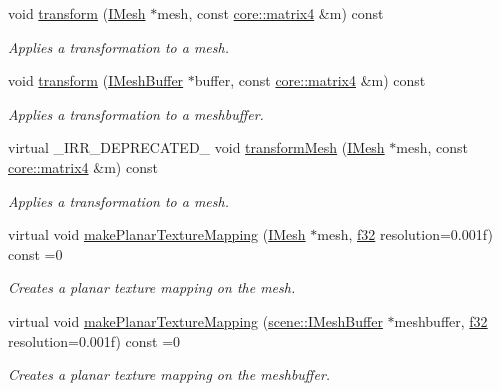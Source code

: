 \begin{DoxyCompactItemize}
void \hyperlink{classirr_1_1scene_1_1IMeshManipulator_a9f9962d31cbd4ebeb1be0812765884cf}{transform} (\hyperlink{classirr_1_1scene_1_1IMesh}{I\+Mesh} $\ast$mesh, const \hyperlink{namespaceirr_1_1core_a73fa92e638c5ca97efd72da307cc9b65}{core\+::matrix4} \&m) const
\begin{DoxyCompactList}\small\item\em Applies a transformation to a mesh. \end{DoxyCompactList}\item 
void \hyperlink{classirr_1_1scene_1_1IMeshManipulator_a14dc2101f7facaddec49f59ed363bbc1}{transform} (\hyperlink{classirr_1_1scene_1_1IMeshBuffer}{I\+Mesh\+Buffer} $\ast$buffer, const \hyperlink{namespaceirr_1_1core_a73fa92e638c5ca97efd72da307cc9b65}{core\+::matrix4} \&m) const
\begin{DoxyCompactList}\small\item\em Applies a transformation to a meshbuffer. \end{DoxyCompactList}\item 
virtual \+\_\+\+I\+R\+R\+\_\+\+D\+E\+P\+R\+E\+C\+A\+T\+E\+D\+\_\+ void \hyperlink{classirr_1_1scene_1_1IMeshManipulator_a10e09e28622a5d1f5fd0f3a65fd2cb5b}{transform\+Mesh} (\hyperlink{classirr_1_1scene_1_1IMesh}{I\+Mesh} $\ast$mesh, const \hyperlink{namespaceirr_1_1core_a73fa92e638c5ca97efd72da307cc9b65}{core\+::matrix4} \&m) const
\begin{DoxyCompactList}\small\item\em Applies a transformation to a mesh. \end{DoxyCompactList}\item 
virtual void \hyperlink{classirr_1_1scene_1_1IMeshManipulator_a82a3092d53e84e751bb13dac8dfa2ab4}{make\+Planar\+Texture\+Mapping} (\hyperlink{classirr_1_1scene_1_1IMesh}{I\+Mesh} $\ast$mesh, \hyperlink{namespaceirr_a0277be98d67dc26ff93b1a6a1d086b07}{f32} resolution=0.\+001f) const =0
\begin{DoxyCompactList}\small\item\em Creates a planar texture mapping on the mesh. \end{DoxyCompactList}\item 
virtual void \hyperlink{classirr_1_1scene_1_1IMeshManipulator_a757511833420a24ed8cbf4dfd6607143}{make\+Planar\+Texture\+Mapping} (\hyperlink{classirr_1_1scene_1_1IMeshBuffer}{scene\+::\+I\+Mesh\+Buffer} $\ast$meshbuffer, \hyperlink{namespaceirr_a0277be98d67dc26ff93b1a6a1d086b07}{f32} resolution=0.\+001f) const =0
\begin{DoxyCompactList}\small\item\em Creates a planar texture mapping on the meshbuffer. \end{DoxyCompactList}\item 

\end{DoxyCompactItemize}

